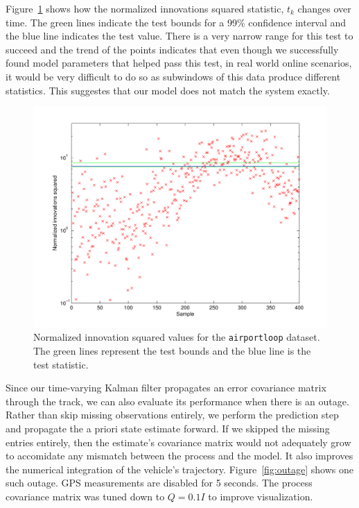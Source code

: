 Figure~\ref{fig:nis} shows how the normalized innovations squared statistic, $t_k$ changes over time.  The green lines indicate the test bounds for a 99\% confidence interval and the blue line indicates the test value.  There is a very narrow range for this test to succeed and the trend of the points indicates that even though we successfully found model parameters that helped pass this test, in real world online scenarios, it would be very difficult to do so as subwindows of this data produce different statistics.  This suggestes that our model does not match the system exactly.

\begin{figure}[!b]
\includegraphics[width=\columnwidth]{nis}
\caption{Normalized innovation squared values for the \texttt{airportloop} dataset.  The green lines represent the test bounds and the blue line is the test statistic.}
\label{fig:nis}
\end{figure}

Since our time-varying Kalman filter propagates an error covariance matrix through the track, we can also evaluate its performance when there is an outage.  Rather than skip missing observations entirely, we perform the prediction step and propagate the a priori state estimate forward.  If we skipped the missing entries entirely, then the estimate's covariance matrix would not adequately grow to accomidate any mismatch between the process and the model.  It also improves the numerical integration of the vehicle's trajectory.  Figure~\ref{fig:outage} shows one such outage.  GPS measurements are disabled for 5 seconds.  The process covariance matrix was tuned down to $Q = 0.1I$ to improve visualization.

